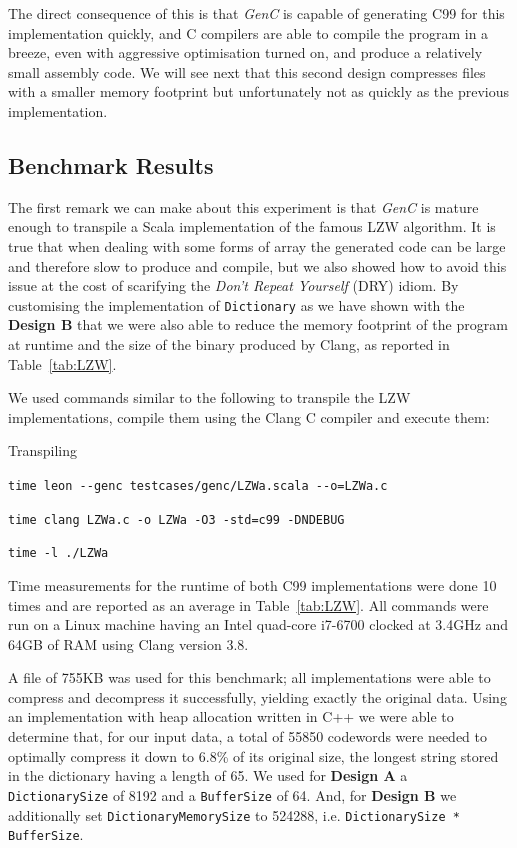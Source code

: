 \documentclass[a4paper,twoside]{article}
\newcommand{\Inline}[1]{\lstinline[basicstyle=\ttfamily]|#1|}
\newcommand{\InlineS}[1]{\lstinline[language=Leon]|#1|}
\newcommand{\GenC}{\emph{GenC}\xspace}
\newcommand{\RefTable}[1]{Table~\ref{#1}}
\begin{document}
The direct consequence of this is that \GenC is capable of generating C99 for
this implementation quickly, and C compilers are able to compile the program in
a breeze, even with aggressive optimisation turned on, and produce a relatively
small assembly code. We will see next that this second design compresses files
with a smaller memory footprint but unfortunately not as quickly as the previous
implementation.

\subsection{Benchmark Results}

The first remark we can make about this experiment is that \GenC is mature
enough to transpile a Scala implementation of the famous LZW algorithm. It is
true that when dealing with some forms of array the generated code can be large
and therefore slow to produce and compile, but we also showed how to avoid this
issue at the cost of scarifying the \emph{Don't Repeat Yourself} (DRY) idiom. By
customising the implementation of \InlineS{Dictionary} as we have shown with the
\textbf{Design B} that we were also able to reduce the memory footprint of the
program at runtime and the size of the binary produced by Clang, as reported in
\RefTable{tab:LZW}.

\pagebreak[4]
We used commands similar to the following to transpile the LZW implementations,
compile them using the Clang C compiler and execute them:

\begin{labeling}{Transpiling}

\item[Transpiling] \Inline{time leon --genc testcases/genc/LZWa.scala --o=LZWa.c}
\item[Compiling] \Inline{time clang LZWa.c -o LZWa -O3 -std=c99 -DNDEBUG}
\item[Running] \Inline{time -l ./LZWa}

\end{labeling}

Time measurements for the runtime of both C99 implementations were done 10 times
and are reported as an average in \RefTable{tab:LZW}. All commands were run on a
Linux machine having an Intel quad-core i7-6700 clocked at 3.4GHz and 64GB of
RAM using Clang version 3.8.

A file of 755KB was used for this benchmark; all implementations were able to
compress and decompress it successfully, yielding exactly the original data.
Using an implementation with heap allocation written in C++ we were able to
determine that, for our input data, a total of 55850 codewords were needed to
optimally compress it down to 6.8\% of its original size, the longest string
stored in the dictionary having a length of 65. We used for \textbf{Design A} a
\InlineS{DictionarySize} of 8192 and a \InlineS{BufferSize} of 64. And, for
\textbf{Design B} we additionally set \InlineS{DictionaryMemorySize} to 524288,
i.e. \InlineS{DictionarySize * BufferSize}.
\end{document}
